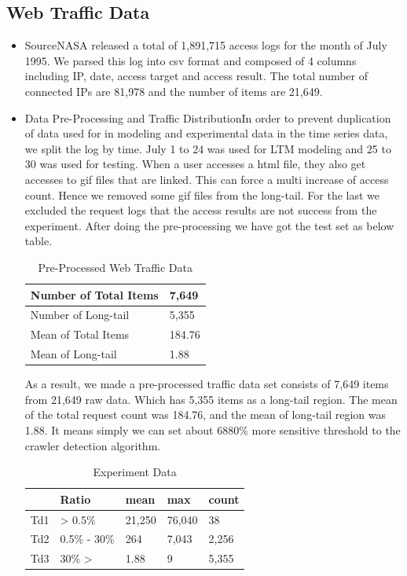 \documentclass[sigconf,anonymous=true]{acmart}
\begin{document}
\subsection{Web Traffic Data}
\begin{itemize}
\item Source\newline NASA released a total of 1,891,715 access logs for the month of July 1995. We parsed this log into csv format and composed of 4 columns including IP, date, access target and access result.
The total number of connected IPs are 81,978 and the number of items are 21,649.\newline

\item Data Pre-Processing and Traffic Distribution\newline In order to prevent duplication of data used for in modeling and experimental data in the time series data, we split the log by time. July 1 to 24 was used for LTM modeling and 25 to 30 was used for testing.
When a user accesses a html file, they also get accesses to gif files that are linked. This can force a multi increase of access count. Hence we removed some gif files from the long-tail. For the last we excluded the request logs that the access results are not success from the experiment. After doing the pre-processing we have got the test set as below table.

\begin{table}[H]
  \caption{Pre-Processed Web Traffic Data}
  \label{tab:freq}
    \begin{tabular}{| p{3.1cm} | p{2cm} |}
    \hline
    Number of Total Items & 7,649 \\ \hline
    Number of Long-tail & 5,355 \\ \hline
    Mean of Total Items & 184.76 \\ \hline
    Mean of Long-tail & 1.88 \\ \hline
    \end{tabular}
\end{table}

As a result, we made a pre-processed traffic data set consists of 7,649 items from 21,649 raw data. Which has 5,355 items as a long-tail region. The mean of the total request count was 184.76, and the mean of long-tail region was 1.88. It means simply we can set about 6880\% more sensitive threshold to the crawler detection algorithm.

\begin{table}[H]
  \caption{Experiment Data}
    \begin{tabular}{| l | l | l | l | l | }
    \hline
    & Ratio & mean & max & count \\ \hline
    Td1 &  > 0.5\% & 21,250 & 76,040 & 38 \\ 
    Td2 & 0.5\% - 30\% & 264 & 7,043 & 2,256 \\
    Td3 & 30\% > & 1.88 & 9 & 5,355 \\ \hline
    \end{tabular}
\end{table}


\end{itemize}
\end{document}
